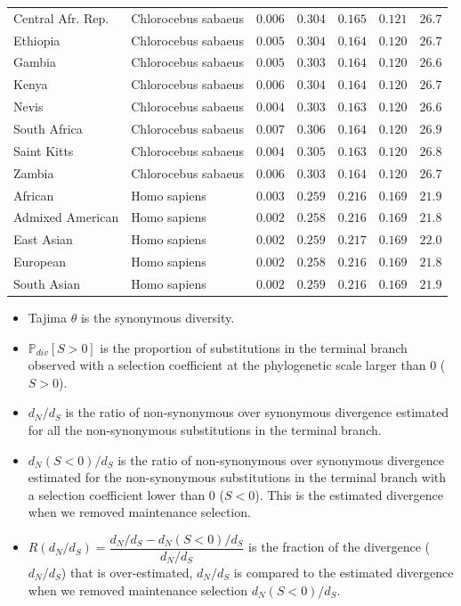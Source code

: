 \documentclass{article}
\newcommand{\dn}{d_N}
\newcommand{\ds}{d_S}
\newcommand{\dnds}{\dn / \ds}
\newcommand{\Sphy}{S}
\begin{document}
\begin{center}
\begin{longtable*}{|l|l|r|r|r|r|r|}
            Central Afr. Rep. & Chlorocebus sabaeus & $ 0.006$ & $ 0.304$ & $ 0.165$ & $ 0.121$ & $ 26.7$ \\
            Ethiopia & Chlorocebus sabaeus & $ 0.005$ & $ 0.304$ & $ 0.164$ & $ 0.120$ & $ 26.7$ \\
            Gambia & Chlorocebus sabaeus & $ 0.005$ & $ 0.303$ & $ 0.164$ & $ 0.120$ & $ 26.6$ \\
            Kenya & Chlorocebus sabaeus & $ 0.006$ & $ 0.304$ & $ 0.164$ & $ 0.120$ & $ 26.7$ \\
            Nevis & Chlorocebus sabaeus & $ 0.004$ & $ 0.303$ & $ 0.163$ & $ 0.120$ & $ 26.6$ \\
            South Africa & Chlorocebus sabaeus & $ 0.007$ & $ 0.306$ & $ 0.164$ & $ 0.120$ & $ 26.9$ \\
            Saint Kitts & Chlorocebus sabaeus & $ 0.004$ & $ 0.305$ & $ 0.163$ & $ 0.120$ & $ 26.8$ \\
            Zambia & Chlorocebus sabaeus & $ 0.006$ & $ 0.303$ & $ 0.164$ & $ 0.120$ & $ 26.7$ \\
            African & Homo sapiens & $ 0.003$ & $ 0.259$ & $ 0.216$ & $ 0.169$ & $ 21.9$ \\
            Admixed American & Homo sapiens & $ 0.002$ & $ 0.258$ & $ 0.216$ & $ 0.169$ & $ 21.8$ \\
            East Asian & Homo sapiens & $ 0.002$ & $ 0.259$ & $ 0.217$ & $ 0.169$ & $ 22.0$ \\
            European & Homo sapiens & $ 0.002$ & $ 0.258$ & $ 0.216$ & $ 0.169$ & $ 21.8$ \\
            South Asian & Homo sapiens & $ 0.002$ & $ 0.259$ & $ 0.216$ & $ 0.169$ & $ 21.9$ \\
        \end{longtable*}
    \end{center}
    \begin{itemize}
        \item Tajima $\theta$ is the synonymous diversity.
        \item $\mathbb{P}_{div}[\Sphy > 0]$ is the proportion of substitutions in the terminal branch observed with a selection coefficient at the phylogenetic scale larger than 0 ($\Sphy > 0$).
        \item $\dnds$ is the ratio of non-synonymous over synonymous divergence estimated for all the non-synonymous substitutions in the terminal branch.
        \item $\dn(\Sphy < 0) / \ds$ is the ratio of non-synonymous over synonymous divergence estimated for the non-synonymous substitutions in the terminal branch with a selection coefficient lower than 0 ($\Sphy < 0$).
        This is the estimated divergence when we removed maintenance selection.
        \item $R(\dnds)=\dfrac{\dnds - \dn(\Sphy < 0) / \ds}{\dnds}$ is the fraction of the divergence ($\dnds$) that is over-estimated, $\dnds$ is compared to the estimated divergence when we removed maintenance selection $\dn(\Sphy < 0) / \ds$.
    \end{itemize}
\end{document}
